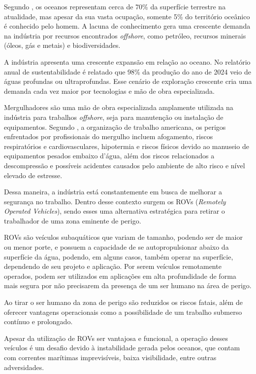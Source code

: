 \documentclass[../main.tex]{subfiles}
\begin{document}
Segundo \cite{biazon2017profundezas}, os oceanos representam cerca de 70\% da superfície terrestre na atualidade, mas apesar da sua vasta ocupação, somente 5\% do território oceânico é conhecido pelo homem. A lacuna de conhecimento gera uma crescente demanda na indústria por recursos encontrados \textit{offshore}, como petróleo, recursos minerais (óleos, gás e metais) e biodiversidades.

A indústria apresenta uma crescente expansão em relação ao oceano. No relatório anual de sustentabilidade \cite{petrobras2024} é relatado que 98\% da produção do ano de 2024 veio de águas profundas ou ultraprofundas. Esse cenário de exploração crescente cria uma demanda cada vez maior por tecnologias e mão de obra especializada.

Mergulhadores são uma mão de obra especializada amplamente utilizada na indústria para trabalhos \textit{offshore}, seja para manutenção ou instalação de equipamentos. Segundo \cite{OSHA2023}, a organização de trabalho americana, os perigos enfrentados por profissionais do mergulho incluem afogamento, riscos respiratórios e cardiovasculares, hipotermia e riscos físicos devido ao manuseio de equipamentos pesados embaixo d'água, além dos riscos relacionados a descompressão e possíveis acidentes causados pelo ambiente  de alto risco e nível elevado de estresse.

Dessa maneira, a indústria está constantemente em busca de melhorar a segurança no trabalho. Dentro desse contexto surgem os ROVs (\textit{Remotely Operated Vehicles}), sendo esses uma alternativa estratégica para retirar o trabalhador de uma zona eminente de perigo.

ROVs são veículos subaquáticos que variam de tamanho, podendo ser de maior ou menor porte, e possuem a capacidade de se autopropulsionar abaixo da superfície da água, podendo, em alguns casos, também operar na superfície, dependendo de seu projeto e aplicação. Por serem veículos remotamente operados, podem ser utilizados em aplicações em alta profundidade de forma mais segura por não precisarem da presença de um ser humano na área de perigo. 

Ao tirar o ser humano da zona de perigo são reduzidos os riscos fatais, além de oferecer vantagens operacionais como a possibilidade de um trabalho submerso contínuo e prolongado.

Apesar da utilização de ROVs ser vantajosa e funcional, a operação desses veículos é um desafio devido à instabilidade gerada pelos oceanos, que contam com correntes marítimas imprevisíveis, baixa visibilidade, entre outras adversidades. 
\end{document}
